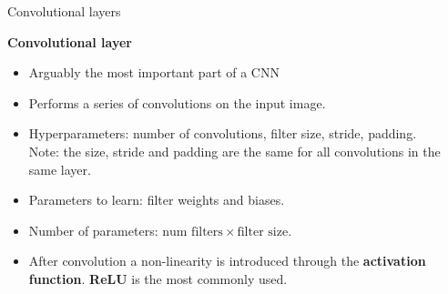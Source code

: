 \documentclass[9pt, aspectratio=169]{beamer}
\begin{document}
\begin{frame}
    {Convolutional layers}

    \textbf{Convolutional layer}

    \begin{itemize}[<+->]
        \item Arguably the most important part of a CNN
        \item Performs a series of convolutions on the input image.
        \item Hyperparameters: number of convolutions, filter size, stride, padding.\\
              Note: the size, stride and padding are the same for all convolutions in the same layer.
        \item Parameters to learn: filter weights and biases.
        \item Number of parameters: $\text{num filters} \times \text{filter size}.$
        \item After convolution a non-linearity is introduced through the \textbf{activation function}. \textbf{ReLU} is the most commonly used.
    \end{itemize}

    \centering
\end{frame}
\end{document}
